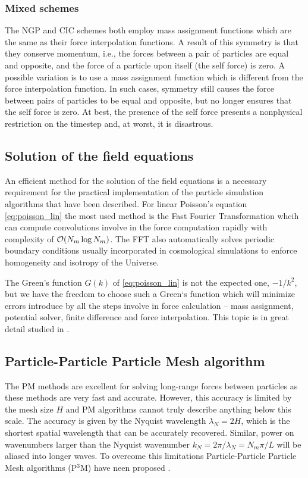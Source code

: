 \subsubsection{Mixed schemes}
The NGP and CIC schemes both employ mass assignment functions which are the same as their force interpolation functions. A result of this symmetry is that they conserve momentum, i.e., the forces between a pair of particles are equal and opposite, and the force of a particle upon itself (the self force) is zero. A possible variation is to use a mass assignment function which is different from the force interpolation function. In such cases, symmetry still causes the force between pairs of particles to be equal and opposite, but no longer ensures that the self force is zero. At best, the presence of the self force presents a nonphysical restriction on the timestep and, at worst, it is disastrous.

\subsection{Solution of the field equations}
An efficient method for the solution of the field equations is a necessary requirement for the practical implementation of the particle simulation algorithms that have been described. For linear Poisson’s equation \eqref{eq:poisson_lin} the most used method is the Fast Fourier Transformation whcih can compute convolutions involve in the force computation rapidly with complexity of $\mathcal{O}(N_m\log N_m)$. The FFT also automatically solves periodic boundary conditions usually incorporated in cosmological simulations to enforce homogeneity and isotropy of the Universe.

The Green's function $G(k)$ of \eqref{eq:poisson_lin} is not the expected one, $-1/k^2$, but we have the freedom to choose such a Green`s function which will minimize errors introduce by all the steps involve in force calculation -- mass assignment, potential solver, finite difference and force interpolation. This topic is in great detail studied in \textcite{Hockney:1988:CSU:62815}.
\subsection{Particle-Particle Particle Mesh algorithm}
The PM methods are excellent for solving long-range forces between particles as these methods are very fast and accurate. However, this accuracy is limited by the mesh size $H$ and PM algorithms cannot truly describe anything below this scale. The accuracy is given by the Nyquist wavelength $\lambda_N=2H$, which is the shortest spatial wavelength that can be accurately recovered. Similar, power on wavenumbers larger than the Nyquist wavenumber $k_N=2\pi/\lambda_N=N_m\pi/L$ will be aliased into longer waves. To overcome this limitations Particle-Particle Particle Mesh algorithms (P$^3$M) have neen proposed \textcite{hockney_10000_1973}.

